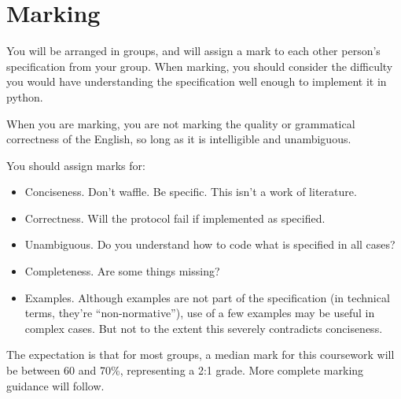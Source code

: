 \documentclass{article}
\begin{document}
\newpage
\section{Marking}

You will be arranged in groups, and will assign a mark to each other
person's specification from your group.  When marking, you should
consider the difficulty you would have understanding the specification
well enough to implement it in python.

When you are marking, you are not marking the quality or grammatical correctness of the English,
so long as it is intelligible and unambiguous.

You should assign marks for:
\begin{itemize}
  \item Conciseness.  Don't waffle.  Be specific.  This isn't a work of literature.
  \item Correctness.  Will the protocol fail if implemented as specified.
  \item  Unambiguous.  Do you understand how to code what is specified in all cases?
  \item  Completeness. Are some things missing?
  \item  Examples. Although examples are not part of the specification (in technical terms, they're ``non-normative''), use of a few examples may be useful in complex cases.  But not to the extent this severely contradicts conciseness.
\end{itemize}

The expectation is that for most groups, a median mark for this
coursework will be between 60 and 70\%, representing a 2:1 grade.
More complete marking guidance will follow.
\end{document}
